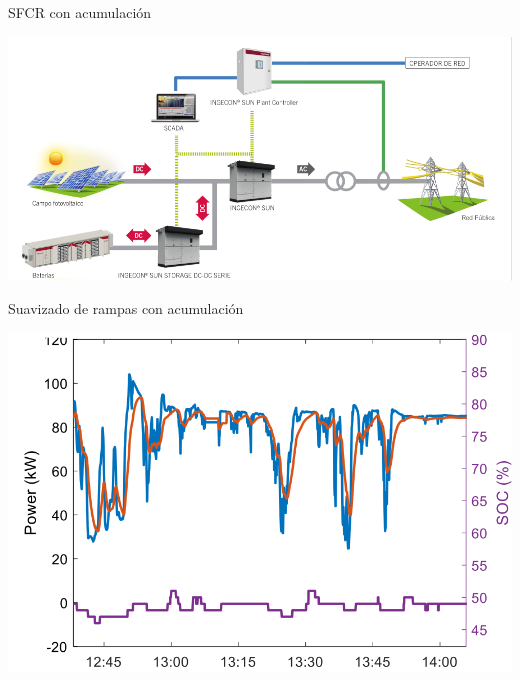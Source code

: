 \documentclass[aspectratio=169, usenames,svgnames,dvipsnames]{beamer}
\begin{document}
\begin{frame}[label={sec:org7c04aa5}]{SFCR con acumulación}
\begin{center}
\includegraphics[width=\textwidth]{../figs/EsquemaSFCRAcumulacion.pdf}
\end{center}
\end{frame}

\begin{frame}[label={sec:org8dd26f9}]{Suavizado de rampas con acumulación}
\begin{center}
\includegraphics[height=0.9\textheight]{../figs/SuavizadoRampasAcumulacion.png}
\end{center}
\end{frame}
\end{document}
